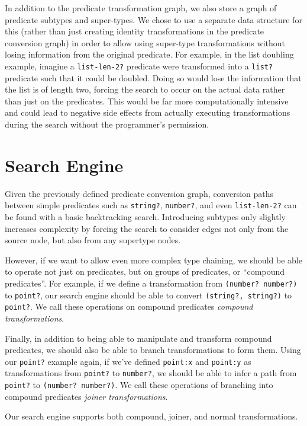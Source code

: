 \documentclass[letterpaper]{article}
\begin{document}
In addition to the predicate transformation graph, we also store a graph of predicate subtypes and super-types.  We chose to use a separate data structure for this (rather than just creating identity transformations in the predicate conversion graph) in order to allow using super-type transformations without losing information from the original predicate.  For example, in the list doubling example, imagine a \texttt{list-len-2?} predicate were transformed into a \texttt{list?} predicate such that it could be doubled.  Doing so would lose the information that the list is of length two, forcing the search to occur on the actual data rather than just on the predicates.  This would be far more computationally intensive and could lead to negative side effects from actually executing transformations during the search without the programmer's permission. 

\section{Search Engine}

Given the previously defined predicate conversion graph, conversion paths between simple predicates such as \texttt{string?}, \texttt{number?}, and even \texttt{list-len-2?} can be found with a basic backtracking search.  Introducing subtypes only slightly increases complexity by forcing the search to consider edges not only from the source node, but also from any supertype nodes.

However, if we want to allow even more complex type chaining, we should be able to operate not just on predicates, but on groups of predicates, or ``compound predicates''.  For example, if we define a transformation from \texttt{(number? number?)} to \texttt{point?}, our search engine should be able to convert \texttt{(string?, string?)} to \texttt{point?}.  We call these operations on compound predicates \textit{compound transformations}.

Finally, in addition to being able to manipulate and transform compound predicates, we should also be able to branch transformations to form them.  Using our \texttt{point?} example again, if we've defined \texttt{point:x} and \texttt{point:y} as transformations from \texttt{point?} to \texttt{number?}, we should be able to infer a path from \texttt{point?} to \texttt{(number? number?)}.  We call these operations of branching into compound predicates \textit{joiner transformations}.

Our search engine supports both compound, joiner, and normal transformations.
\end{document}
